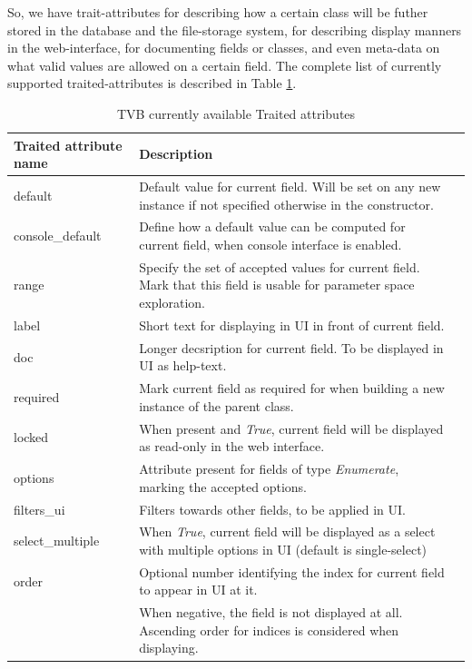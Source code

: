 So, we have trait-attributes for describing how a certain class will be futher stored in the database and the file-storage system,
for describing display manners in the web-interface, for documenting fields or classes, 
and even meta-data on what valid values are allowed on a certain field. 
The complete list of currently supported traited-attributes is described in Table \ref{tab:traits}.

\begin{center}
	\begin{table}[ht]
  	\label{tab:traits}
  	\caption{TVB currently available Traited attributes}

	\begin{tabularx}{\textwidth}{lll}
      		\toprule
      		Traited attribute name    & Description  \\ 
      		\midrule
		default 	& Default value for current field. Will be set on any new instance if not specified otherwise in the constructor.  \\
		console\_default & Define how a default value can be computed for current field, when console interface is enabled. \\
		range	& Specify the set of accepted values for current field. Mark that this field is usable for parameter space exploration. \\

		label		& Short text for displaying in UI in front of current field. \\
		doc		& Longer decsription for current field. To be displayed in UI as help-text. \\
		required	& Mark current field as required for when building a new instance of the parent class. \\
		locked	& When present and \emph{True}, current field will be displayed as read-only in the web interface. \\

		options	& Attribute present for fields of type \emph{Enumerate}, marking the accepted options. \\
		filters\_ui	& Filters towards other fields, to be applied in UI. \\
		select\_multiple & When \emph{True}, current field will be displayed as a select  with multiple options in UI (default is single-select) \\
		order	& Optional number identifying the index for current field to appear in UI at it. \\
				& When negative, the field is not displayed at all. Ascending order for indices is considered when displaying. \\


\end{tabularx}
\end{table}
\end{center}
